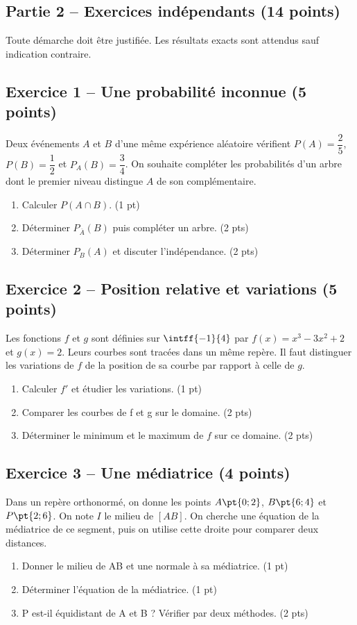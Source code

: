 \mxnewpage\subsection*{Partie 2 -- Exercices indépendants (14 points)}
Toute démarche doit être justifiée. Les résultats exacts sont attendus sauf indication contraire.
\subsection*{Exercice 1 -- Une probabilité inconnue (5 points)}
Deux événements $A$ et $B$ d’une même expérience aléatoire vérifient $P(A)=\dfrac25$, $P(B)=\dfrac12$ et $P_A(B)=\dfrac34$. On souhaite compléter les probabilités d’un arbre dont le premier niveau distingue $A$ de son complémentaire.
\begin{enumerate}
\item Calculer $P(A\cap B)$. \hfill(1 pt)
\item Déterminer $P_{\overline A}(B)$ puis compléter un arbre. \hfill(2 pts)
\item Déterminer $P_B(A)$ et discuter l’indépendance. \hfill(2 pts)
\end{enumerate}
\subsection*{Exercice 2 -- Position relative et variations (5 points)}
Les fonctions $f$ et $g$ sont définies sur $\intff{-1}{4}$ par $f(x)=x^3-3x^2+2$ et $g(x)=2$. Leurs courbes sont tracées dans un même repère. Il faut distinguer les variations de $f$ de la position de sa courbe par rapport à celle de $g$.
\begin{enumerate}
\item Calculer $f\prime$ et étudier les variations. \hfill(1 pt)
\item Comparer les courbes de f et g sur le domaine. \hfill(2 pts)
\item Déterminer le minimum et le maximum de $f$ sur ce domaine. \hfill(2 pts)
\end{enumerate}
\subsection*{Exercice 3 -- Une médiatrice (4 points)}
Dans un repère orthonormé, on donne les points $A\pt{0;2}$, $B\pt{6;4}$ et $P\pt{2;6}$. On note $I$ le milieu de $[AB]$. On cherche une équation de la médiatrice de ce segment, puis on utilise cette droite pour comparer deux distances.
\begin{enumerate}
\item Donner le milieu de AB et une normale à sa médiatrice. \hfill(1 pt)
\item Déterminer l’équation de la médiatrice. \hfill(1 pt)
\item P est-il équidistant de A et B ? Vérifier par deux méthodes. \hfill(2 pts)
\end{enumerate}
